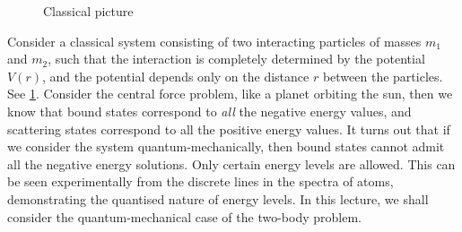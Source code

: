 \documentclass[12pt, a4 paper]{article}
\theoremstyle{definition}
\begin{document}
    \begin{figure}
        \centering
        \caption{Classical picture}\label{fig:twobody}
    \end{figure}
    Consider a classical system consisting of two interacting particles of masses \(m_1\) and \(m_2\), such that the interaction is completely determined by the potential $V(r)$, and the potential depends only on the distance $r$ between the particles. See \cref{fig:twobody}. Consider the central force problem, like a planet orbiting the sun, then we know that bound states correspond to \textit{all} the negative energy values, and scattering states correspond to all the positive energy values. It turns out that if we consider the system quantum-mechanically, then bound states cannot admit all the negative energy solutions. Only certain energy levels are allowed. This can be seen experimentally from the discrete lines in the spectra of atoms, demonstrating the quantised nature of energy levels. In this lecture, we shall consider the quantum-mechanical case of the two-body problem.
\end{document}
